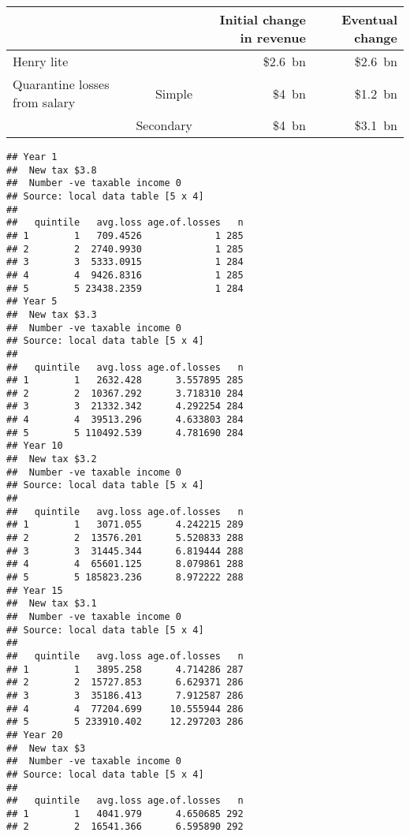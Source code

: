 \documentclass{grattan}\usepackage[]{graphicx}\usepackage[]{color}
\makeatletter
\newenvironment{kframe}{%
 \def\at@end@of@kframe{}%
 \ifinner\ifhmode%
  \def\at@end@of@kframe{\end{minipage}}%
  \begin{minipage}{\columnwidth}%
 \fi\fi%
 \def\FrameCommand##1{\hskip\@totalleftmargin \hskip-\fboxsep
 \colorbox{shadecolor}{##1}\hskip-\fboxsep
     \hskip-\linewidth \hskip-\@totalleftmargin \hskip\columnwidth}%
 \MakeFramed {\advance\hsize-\width
   \@totalleftmargin\z@ \linewidth\hsize
   \@setminipage}}%
 {\par\unskip\endMakeFramed%
 \at@end@of@kframe}
\newenvironment{knitrout}{}{} %
\makeatother
\begin{document}
\begin{table*}
\begin{tabular}{lrrr}
 & & Initial change in revenue & Eventual change \\
 \hline
 Henry lite & & \$2.6~bn & \$2.6~bn\\[4pt]
 Quarantine losses from salary & Simple & \$4~bn & \$1.2~bn \\
                            & Secondary & \$4~bn & \$3.1~bn
\end{tabular}
\end{table*}

\begin{knitrout}
\color{fgcolor}\begin{kframe}
\begin{verbatim}
## Year 1 
##  New tax $3.8 
##  Number -ve taxable income 0 
## Source: local data table [5 x 4]
## 
##   quintile   avg.loss age.of.losses   n
## 1        1   709.4526             1 285
## 2        2  2740.9930             1 285
## 3        3  5333.0915             1 284
## 4        4  9426.8316             1 285
## 5        5 23438.2359             1 284
## Year 5 
##  New tax $3.3 
##  Number -ve taxable income 0 
## Source: local data table [5 x 4]
## 
##   quintile   avg.loss age.of.losses   n
## 1        1   2632.428      3.557895 285
## 2        2  10367.292      3.718310 284
## 3        3  21332.342      4.292254 284
## 4        4  39513.296      4.633803 284
## 5        5 110492.539      4.781690 284
## Year 10 
##  New tax $3.2 
##  Number -ve taxable income 0 
## Source: local data table [5 x 4]
## 
##   quintile   avg.loss age.of.losses   n
## 1        1   3071.055      4.242215 289
## 2        2  13576.201      5.520833 288
## 3        3  31445.344      6.819444 288
## 4        4  65601.125      8.079861 288
## 5        5 185823.236      8.972222 288
## Year 15 
##  New tax $3.1 
##  Number -ve taxable income 0 
## Source: local data table [5 x 4]
## 
##   quintile   avg.loss age.of.losses   n
## 1        1   3895.258      4.714286 287
## 2        2  15727.853      6.629371 286
## 3        3  35186.413      7.912587 286
## 4        4  77204.699     10.555944 286
## 5        5 233910.402     12.297203 286
## Year 20 
##  New tax $3 
##  Number -ve taxable income 0 
## Source: local data table [5 x 4]
## 
##   quintile   avg.loss age.of.losses   n
## 1        1   4041.979      4.650685 292
## 2        2  16541.366      6.595890 292

\end{verbatim}
\end{kframe}
\end{knitrout}
\end{document}
